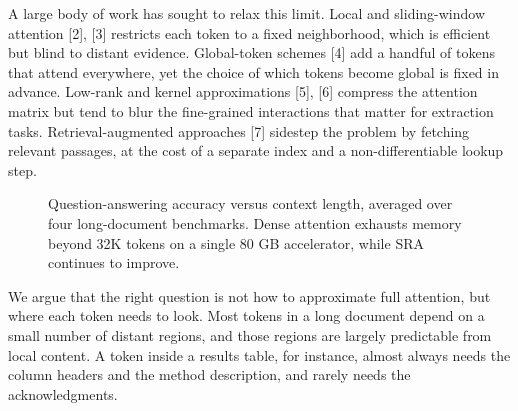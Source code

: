 \documentclass[conference,letterpaper]{IEEEtran}
\begin{document}
A large body of work has sought to relax this limit. Local and sliding-window attention [2], [3] restricts each token to a fixed neighborhood, which is efficient but blind to distant evidence. Global-token schemes [4] add a handful of tokens that attend everywhere, yet the choice of which tokens become global is fixed in advance. Low-rank and kernel approximations [5], [6] compress the attention matrix but tend to blur the fine-grained interactions that matter for extraction tasks. Retrieval-augmented approaches [7] sidestep the problem by fetching relevant passages, at the cost of a separate index and a non-differentiable lookup step.

\begin{figure}[t]
\centering
{}
\caption{Question-answering accuracy versus context length, averaged over four long-document benchmarks. Dense attention exhausts memory beyond 32K tokens on a single 80 GB accelerator, while SRA continues to improve.}
\label{fig:accuracy}
\end{figure}

We argue that the right question is not how to approximate full attention, but where each token needs to look. Most tokens in a long document depend on a small number of distant regions, and those regions are largely predictable from local content. A token inside a results table, for instance, almost always needs the column headers and the method description, and rarely needs the acknowledgments.
\end{document}
